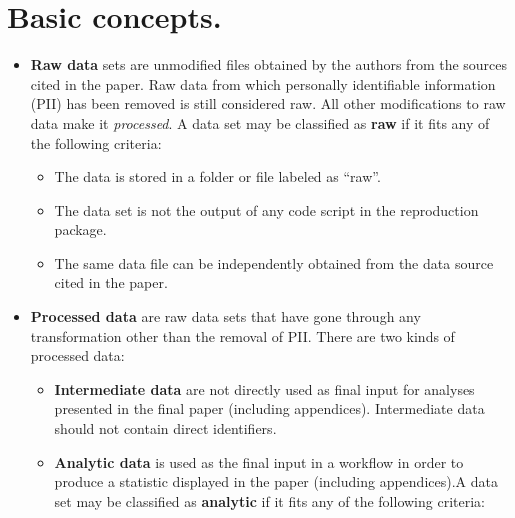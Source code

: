 \documentclass[]{book}
\providecommand{\tightlist}{%
  \setlength{\itemsep}{0pt}\setlength{\parskip}{0pt}}
\begin{document}
\hypertarget{basic-concepts.}{%
\section{Basic concepts.}\label{basic-concepts.}}

\begin{itemize}
\item
  \textbf{Raw data} sets are unmodified files obtained by the authors from the sources cited in the paper. Raw data from which personally identifiable information (PII) has been removed is still considered raw. All other modifications to raw data make it \emph{processed}. A data set may be classified as \textbf{raw} if it fits any of the following criteria:

  \begin{itemize}
  \tightlist
  \item
    The data is stored in a folder or file labeled as ``raw''.\\
  \item
    The data set is not the output of any code script in the reproduction package.\\
  \item
    The same data file can be independently obtained from the data source cited in the paper.
  \end{itemize}
\item
  \textbf{Processed data} are raw data sets that have gone through any transformation other than the removal of PII. There are two kinds of processed data:

  \begin{itemize}
  \tightlist
  \item
    \textbf{Intermediate data} are not directly used as final input for analyses presented in the final paper (including appendices). Intermediate data should not contain direct identifiers.\\
  \item
    \textbf{Analytic data} is used as the final input in a workflow in order to produce a statistic displayed in the paper (including appendices).A data set may be classified as \textbf{analytic} if it fits any of the following criteria:


\end{itemize}
\end{itemize}
\end{document}
